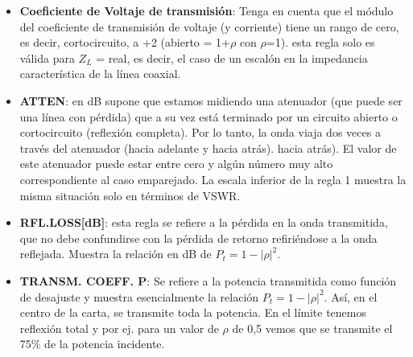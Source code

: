 \documentclass[
	12pt, %
	fleqn, %
	a4paper, %
	oneside, %
]{LegrandOrangeBook}
\begin{document}
\begin{itemize}
\item \textbf{Coeficiente de Voltaje de transmisión}: Tenga en cuenta que el módulo del coeficiente de transmisión de voltaje (y corriente) tiene un rango de cero, es decir, cortocircuito, a +2 (abierto = 1+$\rho$ con $\rho$=1). esta regla solo es válida para $Z_L$ = real, es decir, el caso de un escalón en la impedancia característica de la línea coaxial.
\item \textbf{ATTEN}: en dB supone que estamos midiendo una atenuador (que puede ser una línea con pérdida) que a su vez está terminado por un circuito abierto o cortocircuito (reflexión completa). Por lo tanto, la onda viaja dos veces a través del atenuador (hacia adelante y hacia atrás). hacia atrás). El valor de este atenuador puede estar entre cero y algún número muy alto correspondiente al caso emparejado. La escala inferior de la regla 1 muestra la misma situación solo en términos de VSWR.
\item \textbf{RFL.LOSS[dB]}: esta regla se refiere a la pérdida en la onda transmitida, que no debe confundirse con la pérdida de retorno refiriéndose a la onda reflejada. Muestra la relación en dB de $P_t=1-|\rho|^2$.
\item \textbf{TRANSM. COEFF. P}: Se refiere a la potencia transmitida como función de desajuste y muestra esencialmente la relación $P_t=1-|\rho|^2$. Así, en el centro de la carta, se transmite toda la potencia. En el límite tenemos reflexión total y
por ej. para un valor de $\rho$ de 0,5 vemos que se transmite el 75\% de la potencia incidente.
\end{itemize}
\newpage
\end{document}
